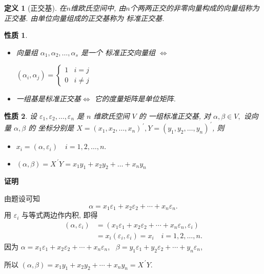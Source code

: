 \documentclass[13pt]{beamer}
\newtheorem*{defi}{定义}
\newtheorem*{prop}{性质}
\def\pf{{\bf 证明~~ }}
\begin{document}
\begin{frame}
\begin{defi}[正交基]
	在$n$维欧氏空间中, 由$n$个两两正交的非零向量构成的向量组称为 \alert{正交基}. 
	由单位向量组成的正交基称为 \alert{标准正交基}.
	
\end{defi}


\begin{prop}
	\begin{itemize}
		\item 向量组 $\alpha_{1}, \alpha_{2}, \ldots, \alpha_{s}$ 是一个
		标准正交向量组
		$\Longleftrightarrow$ 
		\begin{center}
		$\left(\alpha_{i}, \alpha_{j}\right)=
		\left\{\begin{array}{ll} 
		{1} & {i}={j} \\ 
		{0} & {i} \neq {j}
		\end{array}\right.$
		\end{center}

		\item 	一组基是标准正交基$\Longleftrightarrow$ 它的度量矩阵是单位矩阵. 
	\end{itemize}
\end{prop}

\end{frame}
\begin{frame}
\begin{prop}
	设 $\varepsilon_{1}, \varepsilon_{2}, \dots, \varepsilon_{n}$ 是 $n$ 维欧氏空间 $V$ 的
	一组标准正交基, 对 $\alpha, \beta \in V,$ 设向量 $\alpha, \beta$ 的 坐标分别是 $X=\left(x_{1}, x_{2}, \ldots, x_{n}\right)^{\, \prime}, Y=\left(y_{1}, y_{2}, \ldots, y_{n}\right)^{\, \prime}$, 则
	\begin{itemize}
		\item $x_{i}=\left(\alpha, \varepsilon_{i}\right) \quad i=1,2, \dots, n.$
		\item  $(\alpha, \beta)=X^{\, \prime} Y=x_{1} y_{1}+x_{2} y_{2}+\ldots+x_{n} y_{n}$
	\end{itemize}
\end{prop}

\pf 
\small{
由题设可知
	\[
	{\alpha}=x_{1} {\varepsilon}_{1}+x_{2} {\varepsilon}_{2}+\cdots+{x}_{n} {\varepsilon}_{n}.
	\]
	用 ${\varepsilon}_{i}$ 与等式两边作内积, 即得
\begin{align*}
\left( \alpha, \varepsilon_{i}\right)  
& =\left( x_{1} {\varepsilon}_{1}+x_{2} {\varepsilon}_{2}+\cdots+{x}_{n} {\varepsilon}_{n}, \varepsilon_{i} \right)\\
& = x_i ({\varepsilon}_{i},{\varepsilon}_{i} ) =x_i \quad i=1,2, \ldots, n.
\end{align*}
因为\quad \quad
${\alpha}=x_{1} {\varepsilon}_{1}+x_{2} {\varepsilon}_{2}+\cdots+x_{n} {\varepsilon}_{n}$, \,
${\beta}=y_{1} {\varepsilon}_{1}+y_{2} {\varepsilon}_{2}+\cdots+y_{n} {\varepsilon}_{n}$,

所以\qquad \qquad \qquad
$
	({\alpha}, {\beta})=x_{1} y_{1}+x_{2} y_{2}+\cdots+x_{n} y_{n}={X}^{\, \prime} {Y}.
$
}
\end{frame}
\end{document}
